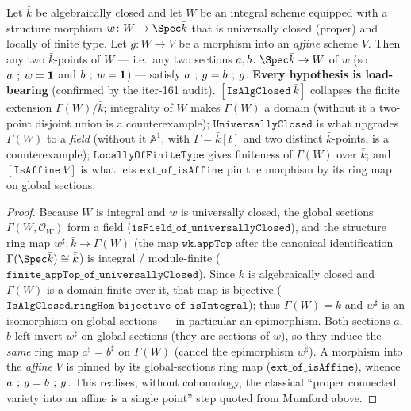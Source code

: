 \begin{lemma}
  \label{lem:eq_comp_of_isAffine_of_properIntegral}
  Let \(\bar k\) be algebraically closed and let \(W\) be an integral scheme equipped with a structure
  morphism \(w \colon W \to \Spec \bar k\) that is universally closed (proper) and locally of finite
  type. Let \(g \colon W \to V\) be a morphism into an \emph{affine} scheme \(V\). Then any two
  \(\bar k\)-points of \(W\) --- i.e.\ any two sections \(a, b \colon \Spec \bar k \to W\) of \(w\) (so
  \(a \fatsemi w = \mathbf 1\) and \(b \fatsemi w = \mathbf 1\)) --- satisfy \(a \fatsemi g = b \fatsemi g\).
  \medskip
  \noindent\textbf{Every hypothesis is load-bearing} (confirmed by the iter-161 audit).
  \([\mathtt{IsAlgClosed}\ \bar k]\) collapses the finite extension \(\Gamma(W)/\bar k\); integrality of
  \(W\) makes \(\Gamma(W)\) a domain (without it a two-point disjoint union is a counterexample);
  \(\mathtt{UniversallyClosed}\) is what upgrades \(\Gamma(W)\) to a \emph{field} (without it
  \(\mathbb A^1\), with \(\Gamma = \bar k[t]\) and two distinct \(\bar k\)-points, is a counterexample);
  \(\mathtt{LocallyOfFiniteType}\) gives finiteness of \(\Gamma(W)\) over \(\bar k\); and
  \([\mathtt{IsAffine}\ V]\) is what lets \(\mathtt{ext\_of\_isAffine}\) pin the morphism by its ring map
  on global sections.
\end{lemma}
\begin{proof}
\leanok
  Because \(W\) is integral and \(w\) is universally closed, the global sections
  \(\Gamma(W, \mathcal O_W)\) form a field (\(\mathtt{isField\_of\_universallyClosed}\)), and the structure
  ring map \(w^\sharp \colon \bar k \to \Gamma(W)\) (the map \(\mathtt{wk.appTop}\) after the canonical
  identification \(\Gamma(\Spec \bar k) \cong \bar k\)) is integral / module-finite
  (\(\mathtt{finite\_appTop\_of\_universallyClosed}\)). Since \(\bar k\) is algebraically closed and
  \(\Gamma(W)\) is a domain finite over it, that map is bijective
  (\(\mathtt{IsAlgClosed.ringHom\_bijective\_of\_isIntegral}\)); thus \(\Gamma(W) = \bar k\) and
  \(w^\sharp\) is an isomorphism on global sections --- in particular an epimorphism. Both sections
  \(a\), \(b\) left-invert \(w^\sharp\) on global sections (they are sections of \(w\)), so they induce the
  \emph{same} ring map \(a^\sharp = b^\sharp\) on \(\Gamma(W)\) (cancel the epimorphism \(w^\sharp\)). A
  morphism into the \emph{affine} \(V\) is pinned by its global-sections ring map
  (\(\mathtt{ext\_of\_isAffine}\)), whence \(a \fatsemi g = b \fatsemi g\). This realises, without
  cohomology, the classical ``proper connected variety into an affine is a single point'' step
  quoted from Mumford above.
\end{proof}
